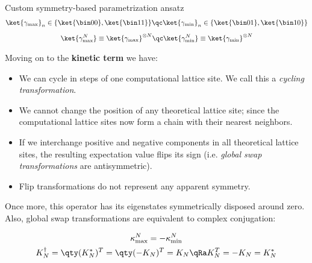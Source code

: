 \begin{frame}[allowframebreaks]{Custom symmetry-based parametrization ansatz}
	\begin{gather*}
	  \ket{\gamma_{\text{max}}}_{n} \in \{\ket{\bin00}, \ket{\bin11}\} \qc
	  \ket{\gamma_{\text{min}}}_{n} \in \{\ket{\bin01}, \ket{\bin10}\} \\[5pt]
	  \ket{\gamma_{\text{max}}^{N}} \equiv
	    \ket{\gamma_{\text{max}}}^{\otimes N} \qc
	  \ket{\gamma_{\text{min}}^{N}} \equiv
	    \ket{\gamma_{\text{min}}}^{\otimes N}
	\end{gather*}

\break

	Moving on to the \textbf{kinetic term} we have:

	\medskip

	\begin{itemize}
	  \item We can cycle in steps of one computational lattice site. We call this a \emph{cycling transformation}.
	  \item We cannot change the position of any theoretical lattice site; since the computational lattice sites now form a chain with their nearest neighbors.
	  \item If we interchange positive and negative components in all theoretical lattice sites, the resulting expectation value flips its sign (i.e. \emph{global swap transformations} are antisymmetric).
	  \item Flip transformations do not represent any apparent symmetry.
	\end{itemize}

	\medskip

	Once more, this operator has its eigenstates symmetrically disposed around zero. Also, global swap transformations are equivalent to complex conjugation:

	\begin{gather*}
		\kappa_{\text{max}}^{N} = -\kappa_{\text{min}}^{N} \\
		K_{N}^{\dagger} = \qty(K_{N}^{*})^{T} = \qty(-K_{N})^{T} = K_{N} \qRa
	    K_{N}^{T} = -K_{N} = K_{N}^{*}
	\end{gather*}

\break


\end{frame}
